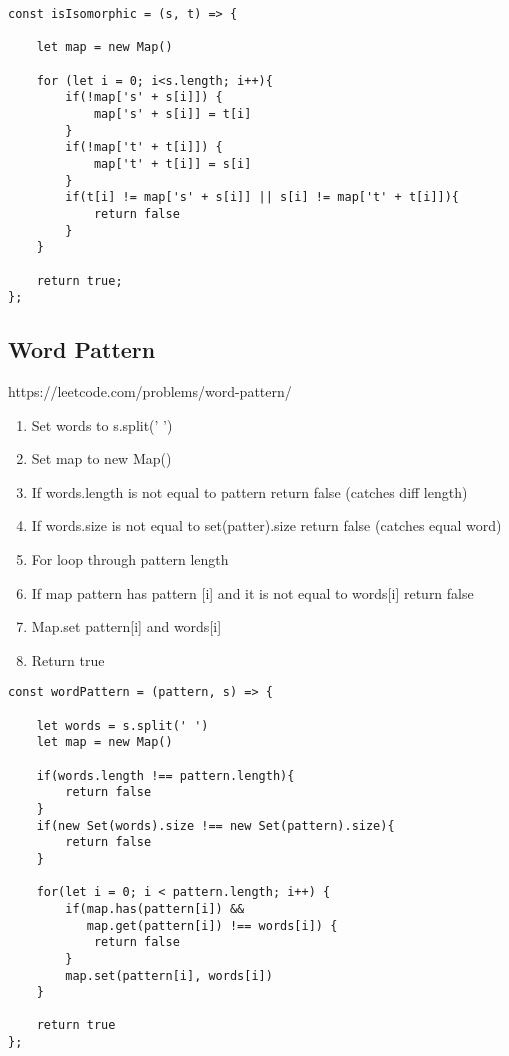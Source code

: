 \documentclass[10pt]{article}
\begin{document}
\begin{lstlisting}[title=Solution isIsomorphic, captionpos=t]
const isIsomorphic = (s, t) => {
    
    let map = new Map()

    for (let i = 0; i<s.length; i++){
        if(!map['s' + s[i]]) {
            map['s' + s[i]] = t[i]
        } 
        if(!map['t' + t[i]]) {
            map['t' + t[i]] = s[i]
        }
        if(t[i] != map['s' + s[i]] || s[i] != map['t' + t[i]]){  
            return false
        } 
    }
    
    return true;
};
\end{lstlisting}

\medskip %











\pagebreak %
\medskip   
\subsection{Word Pattern}
https://leetcode.com/problems/word-pattern/

\begin{enumerate}
	\item Set words to s.split(' ')
	\item Set map to new Map()
	\item If words.length is not equal to pattern return false (catches diff length)
	\item If words.size is not equal to set(patter).size return false (catches equal word)
	\item For loop through pattern length 
	\item If map pattern has pattern [i] and it is not equal to words[i] return false
	\item Map.set pattern[i]  and words[i]
	\item Return true
\end{enumerate}

\begin{lstlisting}[title=Solution wordPattern, captionpos=t]
const wordPattern = (pattern, s) => {
    
    let words = s.split(' ')
    let map = new Map()
    
    if(words.length !== pattern.length){
        return false
    }
    if(new Set(words).size !== new Set(pattern).size){
        return false
    } 
    
    for(let i = 0; i < pattern.length; i++) {
        if(map.has(pattern[i]) && 
           map.get(pattern[i]) !== words[i]) {
            return false
        } 
        map.set(pattern[i], words[i])
    }
    
    return true
};
\end{lstlisting}
\medskip %
\end{document}
